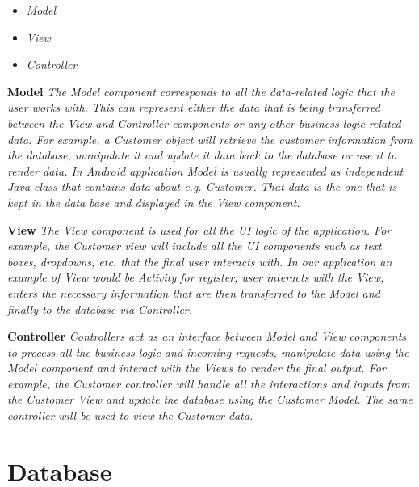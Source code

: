 		\begin{itemize}
			\item 	\textit{Model}
			\item 	\textit{View }
			\item 	\textit{Controller}		
		\end{itemize}

		\textbf{Model}
		\textit{The Model component corresponds to all the data-related logic that the user works with. This can represent either the data that is being transferred between the View and Controller components or any other business logic-related data. For example, a Customer object will retrieve the customer information from the database, manipulate it and update it data back to the database or use it to render data. 
		In Android application Model is usually represented as independent Java class that contains data about e.g. Customer. That data is the one that is kept in the data base and displayed in the View component. }

		\textbf{View}
		\textit{The View component is used for all the UI logic of the application. For example, the Customer view will include all the UI components such as text boxes, dropdowns, etc. that the final user interacts with. 
		In our application an example of View would be Activity for register, user interacts with the View, enters the necessary information that are then transferred to the Model and finally to the database via Controller.}

		\textbf{Controller}
		\textit{Controllers act as an interface between Model and View components to process all the business logic and incoming requests, manipulate data using the Model component and interact with the Views to render the final output. For example, the Customer controller will handle all the interactions and inputs from the Customer View and update the database using the Customer Model. The same controller will be used to view the Customer data.}
\pagebreak
				
		\section{Database}
			
